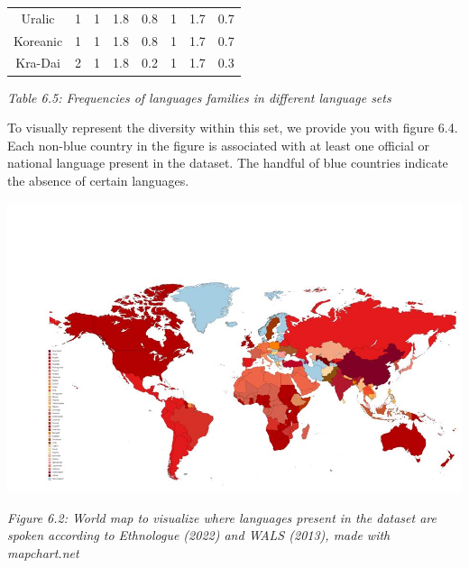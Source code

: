 {\begin{tabular}{|c|c|c|c|c|c|c|c|}
Uralic &
	

1& 
	

1& 
	

1.8& 
	

0.8& 
	

1& 
	

1.7& 
	

0.7\\ 

Koreanic & 
	

1& 
	

1& 
	

1.8& 
	

0.8& 
	

1& 
	

1.7& 
	

0.7\\ 

Kra-Dai &
	

2& 
	

1& 
	

1.8& 
	

0.2& 
	

1& 
	

1.7& 
	

0.3\\ 

\end{tabular}
}

{\it \footnotesize Table 6.5: Frequencies of languages families in different language sets}

\vspace{0.3cm}

\noindent To visually represent the diversity within this set, we provide you with figure 6.4. Each non-blue country in the figure is associated with at least one official or national language present in the dataset. The handful of blue countries indicate the absence of certain languages.  

\begin{center}
\includegraphics[scale=0.4]{./Images/worldatlas.jpg}

	{\it \footnotesize Figure 6.2: World map to visualize where languages present in the dataset are spoken according to Ethnologue (2022) and WALS (2013), made with mapchart.net} 
\end{center}

